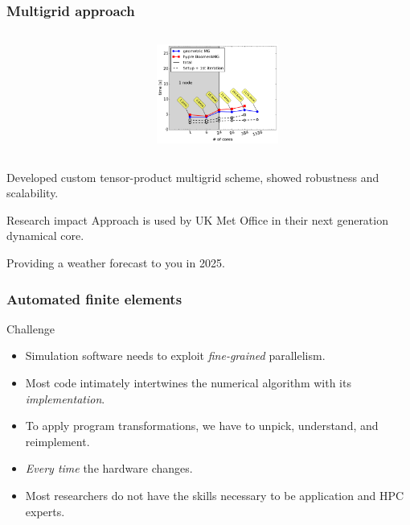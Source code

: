 \documentclass[presentation]{beamer}
\begin{document}
\begin{frame}
  \frametitle{Multigrid approach}
  \begin{columns}
    \begin{column}{0.5\textwidth}
    \end{column}
    \begin{column}{0.4\textwidth}
      \includegraphics[width=4cm]{nwp-multigrid-scaling}
    \end{column}
  \end{columns}
    Developed custom tensor-product multigrid scheme, showed robustness
    and scalability.

  \begin{block}{Research impact}
    Approach is used by UK Met Office in their next generation dynamical
    core.

    Providing a weather forecast to you in 2025.
  \end{block}
\end{frame}

\begin{frame}
  \frametitle{Automated finite elements}
  \begin{block}{Challenge}
  \begin{itemize}
  \item Simulation software needs to exploit \emph{fine-grained}
    parallelism.
  \item Most code intimately intertwines the numerical algorithm with
    its \emph{implementation}.
  \item To apply program transformations, we have to unpick,
    understand, and reimplement.
  \item \emph{Every time} the hardware changes.
  \item Most researchers do not have the skills necessary to be
    application and HPC experts.
  \end{itemize}
  \end{block}
\end{frame}
\end{document}
